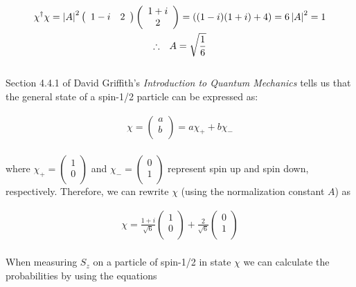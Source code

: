 \documentclass{article}
\begin{document}
\begin{gather}
\chi^{\dag} \chi = \left| A \right|^{2}
\left(
\begin{array}{cc}
1 - i & 2 \\
\end{array} \right)
\left(
\begin{array}{c}
1 + i \\
2 \\
\end{array} \right) = \left(    (1-i)(1+i) + 4  \right) = 6 \left| A \right|^{2} = 1\nonumber\\
\therefore \hspace{.1in} A = \sqrt{\frac{1}{6}} \nonumber
\end{gather}
\\
Section 4.4.1 of David Griffith's \textit{Introduction to Quantum Mechanics} tells us that the general state of a spin-1/2 particle can be expressed as:

\begin{gather}
\chi = \left(
\begin{array}{c}
a \\
b \\
\end{array} \right) = a \chi_{+} + b \chi_{-}
\end{gather}
\\
where $\chi_{+} = \left(
\begin{array}{c}
1 \\
0 \\
\end{array} \right)$ and $\chi_{-} = \left(
\begin{array}{c}
0 \\
1 \\
\end{array} \right)$ represent spin up and spin down, respectively. Therefore, we can rewrite $\chi$ (using the normalization constant $A$) as

\begin{gather}
\chi = \frac{1 + i}{\sqrt{6}}\left(
\begin{array}{c}
1 \\
0 \\
\end{array} \right) +
\frac{2}{\sqrt{6}}\left(
\begin{array}{c}
0 \\
1 \\
\end{array} \right)\nonumber
\end{gather}
\\
When measuring $S_{z}$ on a particle of spin-1/2 in state $\chi$ we can calculate the probabilities by using the equations
\end{document}
